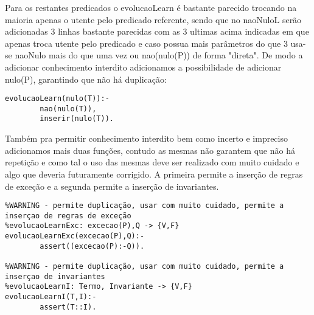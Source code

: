 \documentclass{article}
\begin{document}
Para os restantes predicados o evolucaoLearn é bastante parecido trocando na maioria apenas o utente pelo predicado referente, sendo que no naoNuloL serão adicionadas 3 linhas bastante parecidas com as 3 ultimas acima indicadas em que apenas troca utente pelo predicado e caso possua mais parâmetros do que 3 usa-se naoNulo mais do que uma vez ou nao(nulo(P)) de forma "direta".
De modo a adicionar conhecimento interdito adicionamos a possibilidade de adicionar nulo(P), garantindo que não há duplicação:
\begin{verbatim}
evolucaoLearn(nulo(T)):-
        nao(nulo(T)),
        inserir(nulo(T)).
\end{verbatim}
Também pra permitir conhecimento interdito bem como incerto e impreciso adicionamos mais duas funções, contudo as mesmas não garantem que não há repetição e como tal o uso das mesmas deve ser realizado com muito cuidado e algo que deveria futuramente corrigido. A primeira permite a inserção de regras de exceção e a segunda permite a inserção de invariantes.
\begin{verbatim}
%WARNING - permite duplicação, usar com muito cuidado, permite a inserçao de regras de exceção 
%evolucaoLearnExc: excecao(P),Q -> {V,F}
evolucaoLearnExc(excecao(P),Q):-
        assert((excecao(P):-Q)).

%WARNING - permite duplicação, usar com muito cuidado, permite a inserçao de invariantes
%evolucaoLearnI: Termo, Invariante -> {V,F}
evolucaoLearnI(T,I):-
        assert(T::I).
\end{verbatim}
\end{document}
